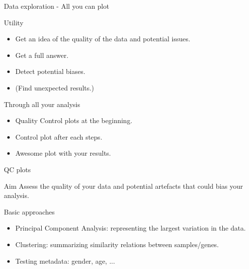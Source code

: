 \documentclass[10pt]{beamer}
\begin{document}
\begin{frame}{Data exploration - All you can plot}
  \begin{block}{Utility}
    \begin{itemize}
    \item Get an idea of the quality of the data and potential issues.
    \item Get a full answer.
    \item Detect potential biases.
    \item (Find unexpected results.)
    \end{itemize}
  \end{block}
  
  \begin{block}{Through all your analysis}
    \begin{itemize}
    \item Quality Control plots at the beginning.
    \item Control plot after each steps.
    \item Awesome plot with your results.
    \end{itemize}
  \end{block}
\end{frame}

\begin{frame}{QC plots}
  \begin{block}{Aim}
    Assess the quality of your data and potential artefacts that could bias your analysis.
  \end{block}
  \begin{block}{Basic approaches}
    \begin{itemize}
    \item Principal Component Analysis: representing the largest variation in the data.
    \item Clustering: summarizing similarity relations between samples/genes.
    \item Testing metadata: gender, age, ...
    \end{itemize}
  \end{block}
\end{frame}
\end{document}
